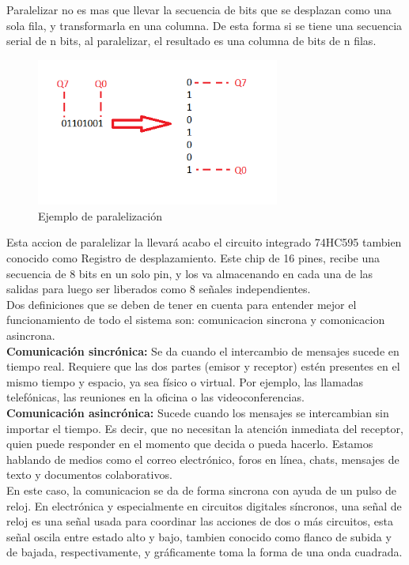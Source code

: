 \documentclass{article}
\begin{document}
Paralelizar no es mas que llevar la secuencia de bits que se desplazan como una sola fila, y transformarla en una columna. De esta forma si se tiene una secuencia serial de n bits, al paralelizar, el resultado es una columna de bits de n filas.

\begin{figure}[!ht]
\includegraphics[width=8cm]{paralelizacion.png}
\centering
\caption{Ejemplo de paralelización}
\end{figure}

Esta accion de paralelizar la llevará acabo el circuito integrado 74HC595 tambien conocido como Registro de desplazamiento. Este chip de 16 pines, recibe una secuencia de 8 bits en un solo pin, y los va almacenando en cada una de las salidas para luego ser liberados como 8 señales independientes.\\

Dos definiciones que se deben de tener en cuenta para entender mejor el funcionamiento de todo el sistema son: comunicacion sincrona y comonicacion asincrona.\\

\noindent\textbf{Comunicación sincrónica:} Se da cuando el intercambio de mensajes sucede en tiempo real. Requiere que las dos partes (emisor y receptor) estén presentes en el mismo tiempo y espacio, ya sea físico o virtual. Por ejemplo, las llamadas telefónicas, las reuniones en la oficina o las videoconferencias.\\

\noindent\textbf{Comunicación asincrónica:} Sucede cuando los mensajes se intercambian sin importar el tiempo. Es decir, que no necesitan la atención inmediata del receptor, quien puede responder en el momento que decida o pueda hacerlo. Estamos hablando de medios como el correo electrónico, foros en línea, chats, mensajes de texto y documentos colaborativos.\cite{sincrosite}\\

En este caso, la comunicacion se da de forma sincrona con ayuda de un pulso de reloj.
En electrónica y especialmente en circuitos digitales síncronos, una señal de reloj es una señal usada para coordinar las acciones de dos o más circuitos, esta señal oscila entre estado alto y bajo, tambien conocido como flanco de subida y de bajada, respectivamente, y gráficamente toma la forma de una onda cuadrada.\cite{relojsite}\\
\end{document}
